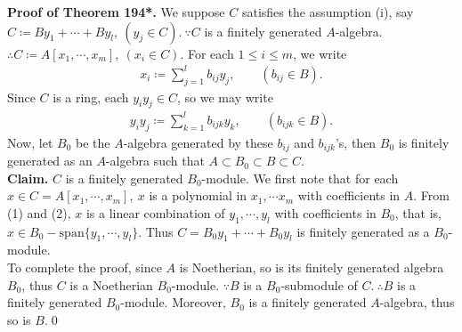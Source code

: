 \documentclass[12pt,a4paper,footinclude=true,headinclude=true]{scrbook} %
\newenvironment{proofthm}[2][Proof of Theorem]
    { \begin{mdframed}[backgroundcolor=gray!20] \textbf{#1 #2.} }
    {  \end{mdframed}}
\begin{document}
\begin{proofthm}{194*}
    We suppose $C$ satisfies the assumption (i), say $C\coloneqq By_1+\cdots+By_l, \ (y_j\in C).\ \because C$ is a finitely generated $A$-algebra. $\therefore C\coloneqq A[x_1,\cdots,x_m],\ (x_i\in C)$. For each $1\leq i\leq m$, we write
    \begin{align}
        x_i\coloneqq\sum_{j=1}^lb_{ij}y_j,\qquad (b_{ij}\in B).
    \end{align}
    Since $C$ is a ring, each $y_iy_j\in C$, so we may write
    \begin{align}
        y_iy_j\coloneqq\sum_{k=1}^lb_{ijk}y_k,\qquad (b_{ijk}\in B).
    \end{align}
    Now, let $B_0$ be the $A$-algebra generated by these $b_{ij}$ and $b_{ijk}$'s, then $B_0$ is finitely generated as an $A$-algebra such that $A\subset B_0\subset B\subset C$. \\
    \textbf{Claim.} $C$ is a finitely generated $B_0$-module. We first note that for each $x\in C=A[x_1,\cdots,x_m],\ x$ is a polynomial in $x_1,\cdots x_m$ with coefficients in $A$. From (1) and (2), $x$ is a linear combination of $y_1,\cdots,y_l$ with coefficients in $B_0$, that is, $x\in B_0-\mathrm{span}\{y_1,\cdots,y_l\}$. Thus $C=B_0y_1+\cdots+B_0y_l$ is finitely generated as a $B_0$-module.\\
    To complete the proof, since $A$ is Noetherian, so is its finitely generated algebra $B_0$, thus $C$ is a Noetherian $B_0$-module. $\because B$ is a $B_0$-submodule of $C.\ \therefore B$ is a finitely generated $B_0$-module. Moreover, $B_0$ is a finitely generated $A$-algebra, thus so is $B$.\qed
\end{proofthm}
\end{document}

